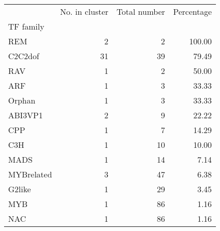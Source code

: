 \begin{tabular}{lrrr}
\toprule
{} &  No. in cluster &  Total number &  Percentage \\
TF family  &                 &               &             \\
\midrule
REM        &               2 &             2 &      100.00 \\
C2C2dof    &              31 &            39 &       79.49 \\
RAV        &               1 &             2 &       50.00 \\
ARF        &               1 &             3 &       33.33 \\
Orphan     &               1 &             3 &       33.33 \\
ABI3VP1    &               2 &             9 &       22.22 \\
CPP        &               1 &             7 &       14.29 \\
C3H        &               1 &            10 &       10.00 \\
MADS       &               1 &            14 &        7.14 \\
MYBrelated &               3 &            47 &        6.38 \\
G2like     &               1 &            29 &        3.45 \\
MYB        &               1 &            86 &        1.16 \\
NAC        &               1 &            86 &        1.16 \\
\bottomrule
\end{tabular}

